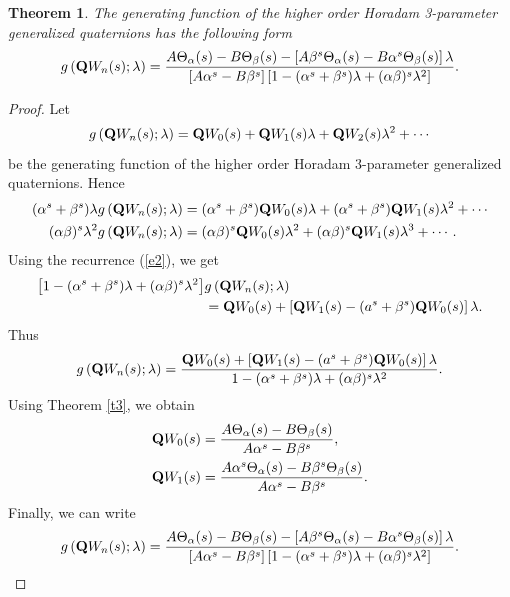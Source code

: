 \documentclass{kms-c}
\theoremstyle{plain}
\newtheorem{theorem}{Theorem}[section]
\theoremstyle{definition}
\theoremstyle{remark}
\begin{document}
\begin{theorem}
The generating function of the higher order Horadam 3-parameter generalized quaternions has the following form
\[
g\left(\textnormal{\textbf{Q}}W_{n}(s);\lambda\right)=\frac{A\Theta_{\alpha}(s)-B\Theta_{\beta}(s)-\left[A\beta^{s}\Theta_{\alpha}(s)-B\alpha^{s}\Theta_{\beta}(s)\right]\lambda}{\left[A\alpha^{s}-B\beta^{s}\right]\left[1-(\alpha^{s}+\beta^{s})\lambda+(\alpha\beta)^{s}\lambda^{2}\right]}.
\]
\end{theorem}
\begin{proof}
Let
\[
g\left(\textnormal{\textbf{Q}}W_{n}(s);\lambda\right)=\textnormal{\textbf{Q}}W_{0}(s)+\textnormal{\textbf{Q}}W_{1}(s)\lambda+\textnormal{\textbf{Q}}W_{2}(s)\lambda^{2}+\cdots 
\]
be the generating function of the higher order Horadam 3-parameter generalized quaternions. Hence
\begin{align*}
(\alpha^{s}+\beta^{s})\lambda g\left(\textnormal{\textbf{Q}}W_{n}(s);\lambda\right)&=(\alpha^{s}+\beta^{s})\textnormal{\textbf{Q}}W_{0}(s)\lambda+(\alpha^{s}+\beta^{s})\textnormal{\textbf{Q}}W_{1}(s)\lambda^{2}+\cdots \\
(\alpha\beta)^{s}\lambda^{2} g\left(\textnormal{\textbf{Q}}W_{n}(s);\lambda\right)&=(\alpha\beta)^{s}\textnormal{\textbf{Q}}W_{0}(s)\lambda^{2}+(\alpha\beta)^{s}\textnormal{\textbf{Q}}W_{1}(s)\lambda^{3}+\cdots .
\end{align*}
Using the recurrence (\ref{e2}), we get
\begin{align*}
\left[1-(\alpha^{s}+\beta^{s})\lambda+(\alpha\beta)^{s}\lambda^{2}\right]&g\left(\textnormal{\textbf{Q}}W_{n}(s);\lambda\right)\\
&=\textnormal{\textbf{Q}}W_{0}(s)+\left[\textnormal{\textbf{Q}}W_{1}(s)-(a^{s}+\beta^{s})\textnormal{\textbf{Q}}W_{0}(s)\right]\lambda .
\end{align*}
Thus
\[
g\left(\textnormal{\textbf{Q}}W_{n}(s);\lambda\right)=\frac{\textnormal{\textbf{Q}}W_{0}(s)+\left[\textnormal{\textbf{Q}}W_{1}(s)-(a^{s}+\beta^{s})\textnormal{\textbf{Q}}W_{0}(s)\right]\lambda}{1-(\alpha^{s}+\beta^{s})\lambda+(\alpha\beta)^{s}\lambda^{2}}.
\]
Using Theorem \ref{t3}, we obtain
\begin{align*}
\textnormal{\textbf{Q}}W_{0}(s)&=\frac{A\Theta_{\alpha}(s)-B\Theta_{\beta}(s)}{A\alpha^{s}-B\beta^{s}},\\
\textnormal{\textbf{Q}}W_{1}(s)&=\frac{A\alpha^{s}\Theta_{\alpha}(s)-B\beta^{s}\Theta_{\beta}(s)}{A\alpha^{s}-B\beta^{s}}.
\end{align*}
Finally, we can write 
\[
g\left(\textnormal{\textbf{Q}}W_{n}(s);\lambda\right)=\frac{A\Theta_{\alpha}(s)-B\Theta_{\beta}(s)-\left[A\beta^{s}\Theta_{\alpha}(s)-B\alpha^{s}\Theta_{\beta}(s)\right]\lambda}{\left[A\alpha^{s}-B\beta^{s}\right]\left[1-(\alpha^{s}+\beta^{s})\lambda+(\alpha\beta)^{s}\lambda^{2}\right]}.
\]
\end{proof}
\end{document}
